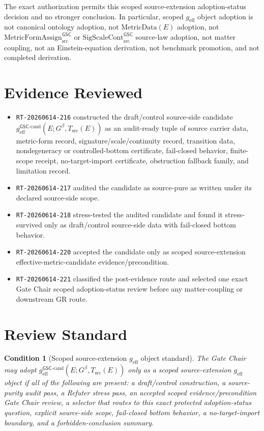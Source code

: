 \documentclass[11pt]{article}
\newcommand{\Gbeta}{G^\beta}
\newcommand{\SigScaleCont}{\mathrm{SigScaleCont}^{\mathsf{GSC}}_{\mathrm{src}}}
\newcommand{\MetricFormAssign}{\mathrm{MetricFormAssign}^{\mathsf{GSC}}_{\mathrm{src}}}
\newcommand{\geff}{g_{\mathrm{eff}}}
\newcommand{\geffCand}{g_{\mathrm{eff}}^{\mathsf{GSC}\mbox{-}\mathrm{cand}}}
\newtheorem{condition}{Condition}
\begin{document}
The exact authorization permits this scoped source-extension adoption-status
decision and no stronger conclusion. In particular, scoped \(\geff\) object
adoption is not canonical ontology adoption, not \(\mathrm{MetricData}(E)\)
adoption, not \(\MetricFormAssign\) or \(\SigScaleCont\) source-law adoption,
not matter coupling, not an Einstein-equation derivation, not benchmark
promotion, and not completed derivation.

\section{Evidence Reviewed}

\begin{itemize}[leftmargin=*]
  \item \texttt{RT-20260614-216} constructed the draft/control source-side
  candidate \(\geffCand(E;\Gbeta,T_{\mathrm{src}}(E))\) as an audit-ready
  tuple of source carrier data, metric-form record, signature/scale/continuity
  record, transition data, nondegeneracy or controlled-bottom certificate,
  fail-closed behavior, finite-scope receipt, no-target-import certificate,
  obstruction fallback family, and limitation record.
  \item \texttt{RT-20260614-217} audited the candidate as source-pure as
  written under its declared source-side scope.
  \item \texttt{RT-20260614-218} stress-tested the audited candidate and found
  it stress-survived only as draft/control source-side data with fail-closed
  bottom behavior.
  \item \texttt{RT-20260614-220} accepted the candidate only as scoped
  source-extension effective-metric-candidate evidence/precondition.
  \item \texttt{RT-20260614-221} classified the post-evidence route and
  selected one exact Gate Chair scoped adoption-status review before any
  matter-coupling or downstream GR route.
\end{itemize}

\section{Review Standard}

\begin{condition}[Scoped source-extension \(\geff\) object standard]
The Gate Chair may adopt \(\geffCand(E;\Gbeta,T_{\mathrm{src}}(E))\) only as a
scoped source-extension \(\geff\) object if all of the following are present:
a draft/control construction, a source-purity audit pass, a Refuter stress
pass, an accepted scoped evidence/precondition Gate Chair review, a selector
that routes to this exact protected adoption-status question, explicit
source-side scope, fail-closed bottom behavior, a no-target-import boundary,
and a forbidden-conclusion summary.
\end{condition}
\end{document}
